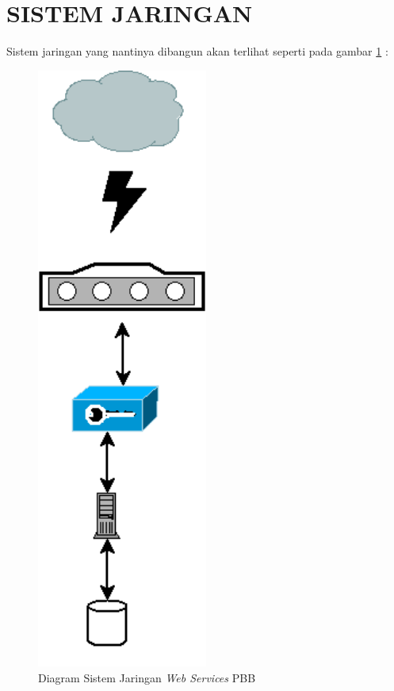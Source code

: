 \documentclass[pdftex,12pt, oneside]{article}
\begin{document}
\section{SISTEM JARINGAN}

Sistem jaringan yang nantinya dibangun akan terlihat seperti pada gambar \ref{fig:network-diagram} :

\begin{figure}[H]
  \centering
  \includegraphics[width=0.5\textwidth]{./resources/diagram/network-diagram}
  \caption{Diagram Sistem Jaringan \textit{Web Services} PBB}
  \label{fig:network-diagram}
\end{figure}
\end{document}
